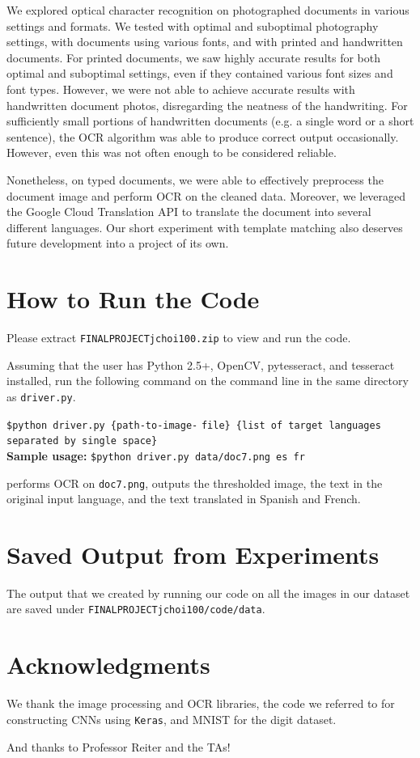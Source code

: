 \documentclass[11pt,letterpaper]{article}
\begin{document}
We explored optical character recognition on photographed documents in various settings and formats. We tested with optimal and suboptimal photography settings, with documents using various fonts, and with printed and handwritten documents. For printed documents, we saw highly accurate results for both optimal and suboptimal settings, even if they contained various font sizes and font types. However, we were not able to achieve accurate results with handwritten document photos, disregarding the neatness of the handwriting. For sufficiently small portions of handwritten documents (e.g. a single word or a short sentence), the OCR algorithm was able to produce correct output occasionally. However, even this was not often enough to be considered reliable. 

Nonetheless, on typed documents, we were able to effectively preprocess the document image and perform OCR on the cleaned data. Moreover, we leveraged the Google Cloud Translation API to translate the document into several different languages. Our short experiment with template matching also deserves future development into a project of its own.

\section*{How to Run the Code}

Please extract {\tt FINAL\textunderscore PROJECT\textunderscore jchoi100.zip} to view and run the code.

Assuming that the user has Python 2.5+, OpenCV, pytesseract, and tesseract installed, run the following command on the command line in the same directory as {\tt driver.py}.

{\tt \$python driver.py \{path-to-image-} {\tt file\} \{list of target languages separated by single space\}}\\

\textbf{Sample usage:} {\tt \$python driver.py data/doc7.png es fr}

performs OCR on {\tt doc7.png}, outputs the thresholded image, the text in the original input language, and the text translated in Spanish and French.

\section*{Saved Output from Experiments}

The output that we created by running our code on all the images in our dataset are saved under {\tt FINAL\textunderscore PROJECT\textunderscore jchoi100/code/data}.

\section*{Acknowledgments}

We thank the image processing and OCR libraries, the code we referred to for constructing CNNs using {\tt Keras}, and MNIST for the digit dataset.

And thanks to Professor Reiter and the TAs!
\end{document}
